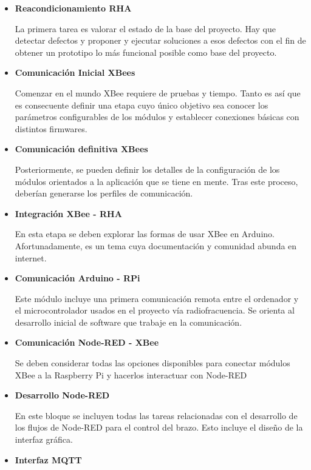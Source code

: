 \begin{itemize}
\item \textbf{Reacondicionamiento RHA}

La primera tarea es valorar el estado de la base del proyecto. Hay que detectar defectos y proponer y ejecutar soluciones a esos defectos con el fin de obtener un prototipo lo más funcional posible como base del proyecto.

\item \textbf{Comunicación Inicial XBees}

Comenzar en el mundo XBee requiere de pruebas y tiempo. Tanto es así que es consecuente definir una etapa cuyo único objetivo sea conocer los parámetros configurables de los módulos y establecer conexiones básicas con distintos firmwares.

\item \textbf{Comunicación definitiva XBees}

Posteriormente, se pueden definir los detalles de la configuración de los módulos orientados a la aplicación que se tiene en mente. Tras este proceso, deberían generarse los perfiles de comunicación.

\item \textbf{Integración XBee - RHA}

En esta etapa se deben explorar las formas de usar XBee en Arduino. Afortunadamente, es un tema cuya documentación y comunidad abunda en internet.

\item \textbf{Comunicación Arduino - RPi}

Este módulo incluye una primera comunicación remota entre el ordenador y el microcontrolador usados en el proyecto vía radiofracuencia. Se orienta al desarrollo inicial de software que trabaje en la comunicación.

\item \textbf{Comunicación Node-RED - XBee}

Se deben considerar todas las opciones disponibles para conectar módulos XBee a la Raspberry Pi y hacerlos interactuar con Node-RED

\item \textbf{Desarrollo Node-RED}

En este bloque se incluyen todas las tareas relacionadas con el desarrollo de los flujos de Node-RED para el control del brazo. Esto incluye el diseño de la interfaz gráfica.

\item \textbf{Interfaz MQTT}


\end{itemize}
